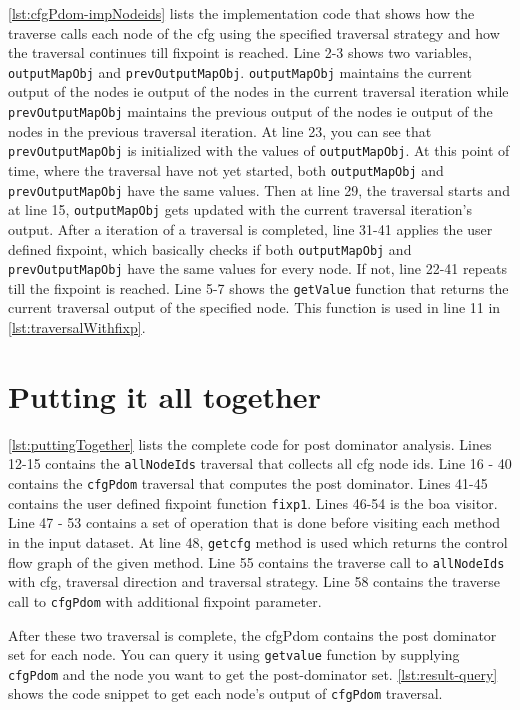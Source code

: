 \ref{lst:cfgPdom-impNodeids} lists the implementation code that shows how the traverse calls each node of the cfg using the specified traversal strategy and how the traversal continues till fixpoint is reached. Line 2-3 shows two variables, \lstinline|outputMapObj| and \lstinline|prevOutputMapObj|. \lstinline|outputMapObj| maintains the current output of the nodes ie output of the nodes in the current traversal iteration while \lstinline|prevOutputMapObj| maintains the previous output of the nodes ie output of the nodes in the previous traversal iteration.
At line 23, you can see that \lstinline|prevOutputMapObj| is initialized with the values of \lstinline|outputMapObj|. At this point of time, where the traversal have not yet started, both \lstinline|outputMapObj| and \lstinline|prevOutputMapObj| have the same values. Then at line 29, the traversal starts and at line 15, \lstinline|outputMapObj| gets updated with the current traversal iteration's output. After a iteration of a traversal is completed, line 31-41 applies the user defined fixpoint, which basically checks if both \lstinline|outputMapObj| and \lstinline|prevOutputMapObj| have the same values for every node. If not, line 22-41 repeats till the fixpoint is reached. Line 5-7 shows the \lstinline|getValue| function that returns the current traversal output of the specified node. This function is used in line 11 in \ref{lst:traversalWithfixp}.

\section{Putting it all together}

\ref{lst:puttingTogether} lists the complete code for post dominator analysis. Lines 12-15 contains the \lstinline|allNodeIds| traversal that collects all cfg node ids. Line 16 - 40 contains the \lstinline|cfgPdom| traversal that computes the post dominator. Lines 41-45 contains the user defined fixpoint function \lstinline|fixp1|. Lines 46-54 is the boa visitor. Line 47 - 53 contains a set of operation that is done before visiting each method in the input dataset. At line 48, \lstinline|getcfg| method is used which returns the control flow graph of the given method. Line 55 contains the traverse call to \lstinline|allNodeIds| with cfg, traversal direction and traversal strategy. Line 58 contains the traverse call to \lstinline|cfgPdom| with additional fixpoint parameter. 


After these two traversal is complete, the cfgPdom contains the post dominator set for each node. You can query it using \lstinline|getvalue| function by supplying \lstinline|cfgPdom| and the node you want to get the post-dominator set. \ref{lst:result-query} shows the code snippet to get each node's output of \lstinline|cfgPdom| traversal. 